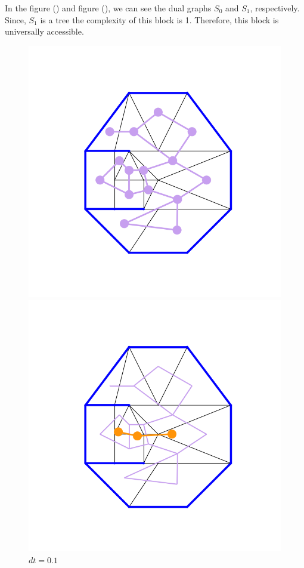 \documentclass[10pt]{article}
\begin{document}
In the figure () and figure (), we can see the dual graphs $S_0$ and $S_1$, respectively. Since, $S_1$ is a tree the complexity of this block is 1. Therefore, this block is universally accessible.

\begin{figure}[H]
    \centering
    \begin{minipage}{.4\linewidth}
        \centering
        \includegraphics[width=1\textwidth]{images/Figure_9.png}
        \caption{$dt=0.1$}
        \label{fig:prob1_6_2}
    \end{minipage}%
    \begin{minipage}{.4\linewidth}
        \centering
        \includegraphics[width=1\textwidth]{images/Figure_11.png}
        \caption{$dt=0.1$}
        \label{fig:prob1_6_2}
    \end{minipage}
\end{figure}
\end{document}
